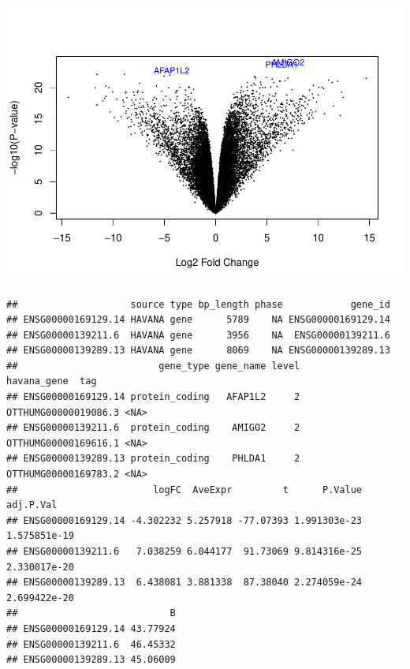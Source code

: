 \documentclass[
]{article}
\newenvironment{Shaded}{\begin{snugshade}}{\end{snugshade}}
\newcommand{\AttributeTok}[1]{\textcolor[rgb]{0.13,0.29,0.53}{#1}}
\newcommand{\CommentTok}[1]{\textcolor[rgb]{0.56,0.35,0.01}{\textit{#1}}}
\newcommand{\DecValTok}[1]{\textcolor[rgb]{0.00,0.00,0.81}{#1}}
\newcommand{\FunctionTok}[1]{\textcolor[rgb]{0.13,0.29,0.53}{\textbf{#1}}}
\newcommand{\NormalTok}[1]{#1}
\newcommand{\SpecialCharTok}[1]{\textcolor[rgb]{0.81,0.36,0.00}{\textbf{#1}}}
\newcommand{\StringTok}[1]{\textcolor[rgb]{0.31,0.60,0.02}{#1}}
\begin{document}
\begin{Shaded}
\end{Shaded}

\includegraphics{Proyecto_RNAseq_files/figure-latex/unnamed-chunk-15-1.pdf}

\begin{Shaded}
\end{Shaded}

\begin{verbatim}
##                    source type bp_length phase            gene_id
## ENSG00000169129.14 HAVANA gene      5789    NA ENSG00000169129.14
## ENSG00000139211.6  HAVANA gene      3956    NA  ENSG00000139211.6
## ENSG00000139289.13 HAVANA gene      8069    NA ENSG00000139289.13
##                         gene_type gene_name level          havana_gene  tag
## ENSG00000169129.14 protein_coding   AFAP1L2     2 OTTHUMG00000019086.3 <NA>
## ENSG00000139211.6  protein_coding    AMIGO2     2 OTTHUMG00000169616.1 <NA>
## ENSG00000139289.13 protein_coding    PHLDA1     2 OTTHUMG00000169783.2 <NA>
##                        logFC  AveExpr         t      P.Value    adj.P.Val
## ENSG00000169129.14 -4.302232 5.257918 -77.07393 1.991303e-23 1.575851e-19
## ENSG00000139211.6   7.038259 6.044177  91.73069 9.814316e-25 2.330017e-20
## ENSG00000139289.13  6.438081 3.881338  87.38040 2.274059e-24 2.699422e-20
##                           B
## ENSG00000169129.14 43.77924
## ENSG00000139211.6  46.45332
## ENSG00000139289.13 45.06009
\end{verbatim}
\end{document}
